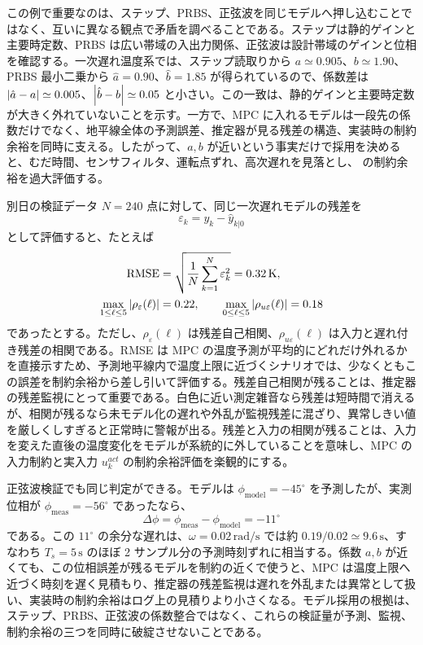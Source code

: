 この例で重要なのは、ステップ、PRBS、正弦波を同じモデルへ押し込むことではなく、互いに異なる観点で矛盾を調べることである。ステップは静的ゲインと主要時定数、PRBS は広い帯域の入出力関係、正弦波は設計帯域のゲインと位相を確認する。一次遅れ温度系では、ステップ読取りから $a\simeq0.905$、$b\simeq1.90$、PRBS 最小二乗から $\hat{a}=0.90$、$\hat{b}=1.85$ が得られているので、係数差は $\left|\hat{a}-a\right|\simeq0.005$、$\left|\hat{b}-b\right|\simeq0.05$ と小さい。この一致は、静的ゲインと主要時定数が大きく外れていないことを示す。一方で、MPC に入れるモデルは一段先の係数だけでなく、地平線全体の予測誤差、推定器が見る残差の構造、実装時の制約余裕を同時に支える。したがって、$a,b$ が近いという事実だけで採用を決めると、むだ時間、センサフィルタ、運転点ずれ、高次遅れを見落とし、 の制約余裕を過大評価する。

別日の検証データ $N=240$ 点に対して、同じ一次遅れモデルの残差を
\begin{equation}
  \varepsilon_k=y_k-\hat{y}_{k|0}
\end{equation}
として評価すると、たとえば
\begin{align}
  \mathrm{RMSE}
  &=\sqrt{\frac{1}{N}\sum_{k=1}^{N}\varepsilon_k^2}
    =0.32\,\mathrm{K},\\
  \max_{1\le\ell\le5}\left|\rho_{\varepsilon}(\ell)\right|
  &=0.22,\qquad
  \max_{0\le\ell\le5}\left|\rho_{u\varepsilon}(\ell)\right|
  =0.18
\end{align}
であったとする。ただし、$\rho_{\varepsilon}(\ell)$ は残差自己相関、$\rho_{u\varepsilon}(\ell)$ は入力と遅れ付き残差の相関である。RMSE は MPC の温度予測が平均的にどれだけ外れるかを直接示すため、予測地平線内で温度上限に近づくシナリオでは、少なくともこの誤差を制約余裕から差し引いて評価する。残差自己相関が残ることは、推定器の残差監視にとって重要である。白色に近い測定雑音なら残差は短時間で消えるが、相関が残るなら未モデル化の遅れや外乱が監視残差に混ざり、異常しきい値を厳しくしすぎると正常時に警報が出る。残差と入力の相関が残ることは、入力を変えた直後の温度変化をモデルが系統的に外していることを意味し、MPC の入力制約と実入力 $u_k^{act}$ の制約余裕評価を楽観的にする。

正弦波検証でも同じ判定ができる。モデルは $\phi_{\mathrm{model}}=-45^\circ$ を予測したが、実測位相が $\phi_{\mathrm{meas}}=-56^\circ$ であったなら、
\begin{equation}
  \Delta\phi=\phi_{\mathrm{meas}}-\phi_{\mathrm{model}}=-11^\circ
\end{equation}
である。この $11^\circ$ の余分な遅れは、$\omega=0.02\,\mathrm{rad/s}$ では約 $0.19/0.02\simeq9.6\,\mathrm{s}$、すなわち $T_s=5\,\mathrm{s}$ のほぼ 2 サンプル分の予測時刻ずれに相当する。係数 $a,b$ が近くても、この位相誤差が残るモデルを制約の近くで使うと、MPC は温度上限へ近づく時刻を遅く見積もり、推定器の残差監視は遅れを外乱または異常として扱い、実装時の制約余裕はログ上の見積りより小さくなる。モデル採用の根拠は、ステップ、PRBS、正弦波の係数整合ではなく、これらの検証量が予測、監視、制約余裕の三つを同時に破綻させないことである。

